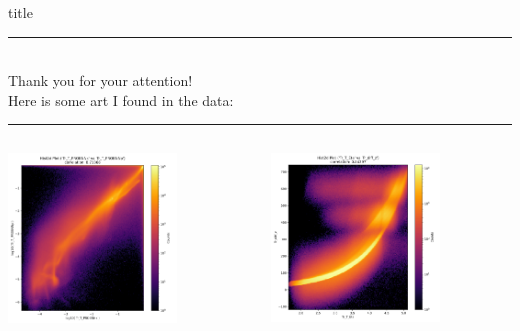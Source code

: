 \documentclass[aspectratio=1610, 10pt]{beamer}
\begin{document}
\begin{frame}[plain]
  \centering
  \begin{beamercolorbox}[center, wd=\textwidth]{title}
    \textcolor{tugreen}{\rule{\textwidth}{1pt}}\\[0.5\baselineskip]%
    Thank you for your attention!
    \\[0.5\baselineskip]%
    Here is some art I found in the data:\newline%
    \textcolor{tugreen}{\rule{\textwidth}{1pt}}%
  \end{beamercolorbox}%
  \begin{columns}
    \begin{column}{0.5\textwidth}
      \centering
      \includegraphics[width=0.7\textwidth]{images/backup/art1.png}
    \end{column}
    \begin{column}{0.5\textwidth}
      \centering
      \includegraphics[width=0.7\textwidth]{images/backup/art2.png}
    \end{column}
  \end{columns}
\end{frame}
\end{document}
